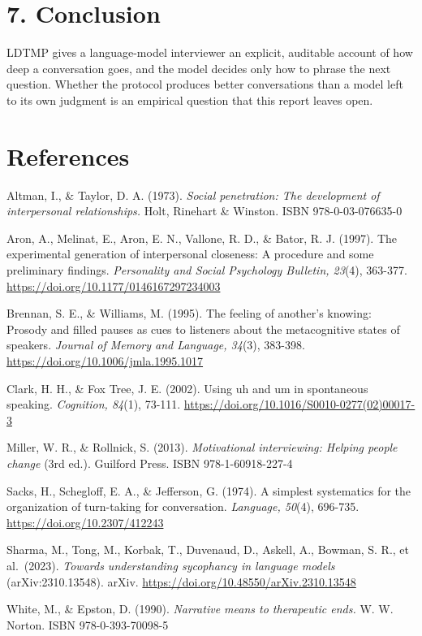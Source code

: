 \documentclass[11pt]{article}
\begin{document}
\section{7. Conclusion}

LDTMP gives a language-model interviewer an explicit, auditable account
of how deep a conversation goes, and the model decides only how to
phrase the next question. Whether the protocol produces better
conversations than a model left to its own judgment is an empirical
question that this report leaves open.

\section{References}

{\small\setlength{\parindent}{-1.5em}\setlength{\leftskip}{1.5em}
Altman, I., \& Taylor, D. A. (1973). \emph{Social penetration: The
development of interpersonal relationships.} Holt, Rinehart \& Winston.
ISBN 978-0-03-076635-0

Aron, A., Melinat, E., Aron, E. N., Vallone, R. D., \& Bator, R. J.
(1997). The experimental generation of interpersonal closeness: A
procedure and some preliminary findings. \emph{Personality and Social
Psychology Bulletin, 23}(4), 363-377.
\url{https://doi.org/10.1177/0146167297234003}

Brennan, S. E., \& Williams, M. (1995). The feeling of another's
knowing: Prosody and filled pauses as cues to listeners about the
metacognitive states of speakers. \emph{Journal of Memory and Language,
34}(3), 383-398. \url{https://doi.org/10.1006/jmla.1995.1017}

Clark, H. H., \& Fox Tree, J. E. (2002). Using uh and um in spontaneous
speaking. \emph{Cognition, 84}(1), 73-111.
\url{https://doi.org/10.1016/S0010-0277(02)00017-3}

Miller, W. R., \& Rollnick, S. (2013). \emph{Motivational interviewing:
Helping people change} (3rd ed.). Guilford Press. ISBN 978-1-60918-227-4

Sacks, H., Schegloff, E. A., \& Jefferson, G. (1974). A simplest
systematics for the organization of turn-taking for conversation.
\emph{Language, 50}(4), 696-735. \url{https://doi.org/10.2307/412243}

Sharma, M., Tong, M., Korbak, T., Duvenaud, D., Askell, A., Bowman, S.
R., et al.~(2023). \emph{Towards understanding sycophancy in language
models} (arXiv:2310.13548). arXiv.
\url{https://doi.org/10.48550/arXiv.2310.13548}

White, M., \& Epston, D. (1990). \emph{Narrative means to therapeutic
ends.} W. W. Norton. ISBN 978-0-393-70098-5\par}
\end{document}
